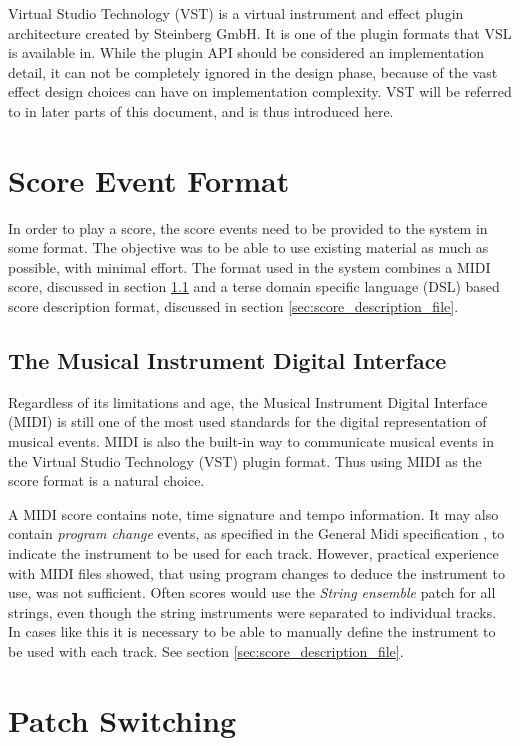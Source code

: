 Virtual Studio Technology (VST) \cite{vst} is
a virtual instrument and effect plugin architecture created by Steinberg GmbH.
It is one of the plugin formats that VSL is available in.
While the plugin API should be considered an implementation detail,
it can not be completely ignored in the design phase,
because of the vast effect design choices can have on implementation complexity.
VST will be referred to in later parts of this document,
and is thus introduced here.

\section{Score Event Format}

In order to play a score,
the score events need to be provided to the system in some format.
The objective was to be able to use existing material as much as possible,
with minimal effort.
The format used in the system combines
a MIDI score, discussed in section \ref{sec:midi} and
a terse domain specific language (DSL) based score description format,
discussed in section \ref{sec:score_description_file}.

\subsection{The Musical Instrument Digital Interface}
\label{sec:midi}

Regardless of its limitations and age,
the Musical Instrument Digital Interface (MIDI)
is still one of the most used standards
for the digital representation of musical events.
MIDI is also the built-in way to communicate musical events
in the Virtual Studio Technology (VST) plugin format.
Thus using MIDI as the score format is a natural choice.

A MIDI score contains note, time signature and tempo information.
It may also contain \textit{program change} events,
as specified in the General Midi specification \cite{GeneralMidi},
to indicate the instrument to be used for each track.
However, practical experience with MIDI files showed,
that using program changes to deduce the instrument to use,
was not sufficient.
Often scores would use the
\textit{String ensemble} patch for all strings,
even though the string instruments were separated to individual tracks.
In cases like this it is necessary to be able to manually
define the instrument to be used with each track.
See section \ref{sec:score_description_file}.

\section{Patch Switching}
\label{sec:patch_switching}

